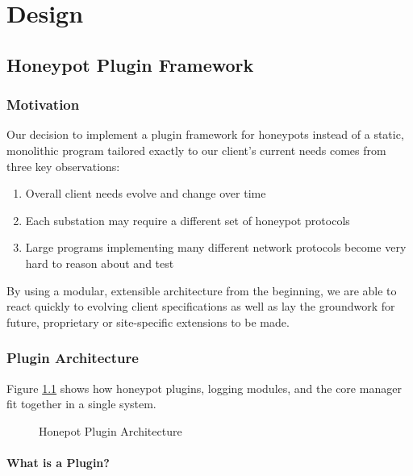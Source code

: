 \chapter{Design}

\section{Honeypot Plugin Framework}

\subsection{Motivation}

Our decision to implement a plugin framework for honeypots instead of a
static, monolithic program tailored exactly to our client's current needs
comes from three key observations:

\begin{enumerate}
    \item Overall client needs evolve and change over time
    \item Each substation may require a different set of honeypot protocols
    \item Large programs implementing many different network protocols become
    very hard to reason about and test
\end{enumerate}

By using a modular, extensible architecture from the beginning, we are able
to react quickly to evolving client specifications as well as lay the groundwork
for future, proprietary or site-specific extensions to be made.

\subsection{Plugin Architecture}

Figure \ref{fig:hpot-arch} shows how honeypot plugins, logging modules, and
the core manager fit together in a single system.

\begin{center}
\begin{figure}
{
\scalebox{0.7}{}
}
\label{fig:hpot-arch}
\caption{Honepot Plugin Architecture}
\end{figure}
\end{center}

\subsubsection{What is a Plugin?}


